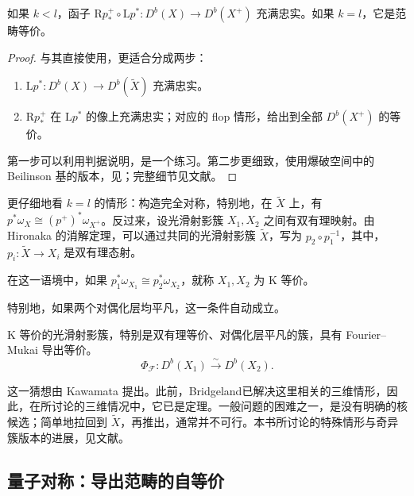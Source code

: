 \begin{theorem}\label{thm:4.79}
如果 $k<l$，函子 $\mathrm{R}p^+_*\circ\mathrm{L}p^*\colon D^b(X)\to D^b(X^+)$ 充满忠实。如果 $k=l$，它是范畴等价。
\end{theorem}
\begin{proof}
与其直接使用，更适合分成两步：
\begin{enumerate}[label=(\arabic*)]
\item $\mathrm{L}p^*\colon D^b(X)\to D^b(\widetilde X)$ 充满忠实。
\item $\mathrm{R}p^+_*$ 在 $\mathrm{L}p^*$ 的像上充满忠实；对应的 flop 情形，给出到全部 $D^b(X^+)$ 的等价。
\end{enumerate}
第一步可以利用判据说明，是一个练习。第二步更细致，使用爆破空间中的 Beilinson 基的版本，见；完整细节见文献。\BookQED
\end{proof}

更仔细地看 $k=l$ 的情形：构造完全对称，特别地，在 $\widetilde X$ 上，有 $p^*\omega_X\cong(p^+)^*\omega_{X^+}$。反过来，设光滑射影簇 $X_1,X_2$ 之间有双有理映射。由 Hironaka 的消解定理，可以通过共同的光滑射影簇 $\widetilde X$，写为 $p_2\circ p_1^{-1}$，其中，$p_i\colon\widetilde X\to X_i$ 是双有理态射。
\begin{definition}\label{def:4.80}
在这一语境中，如果 $p_1^*\omega_{X_1}\cong p_2^*\omega_{X_2}$，就称 $X_1,X_2$ 为 K 等价。
\end{definition}
特别地，如果两个对偶化层均平凡，这一条件自动成立。

\begin{conjecture}\label{conj:4.81}
K 等价的光滑射影簇，特别是双有理等价、对偶化层平凡的簇，具有 Fourier--Mukai 导出等价。
\[
\Phi_{\mathcal{F}}\colon D^b(X_1)\xrightarrow{\sim}D^b(X_2).
\]
\end{conjecture}

这一猜想由 Kawamata 提出。此前，Bridgeland已解决这里相关的三维情形，因此，在所讨论的三维情况中，它已是定理。一般问题的困难之一，是没有明确的核候选；简单地拉回到 $\widetilde X$，再推出，通常并不可行。本书所讨论的特殊情形与奇异簇版本的进展，见文献。

\subsection{量子对称：导出范畴的自等价}\label{sec:4.6.6}

